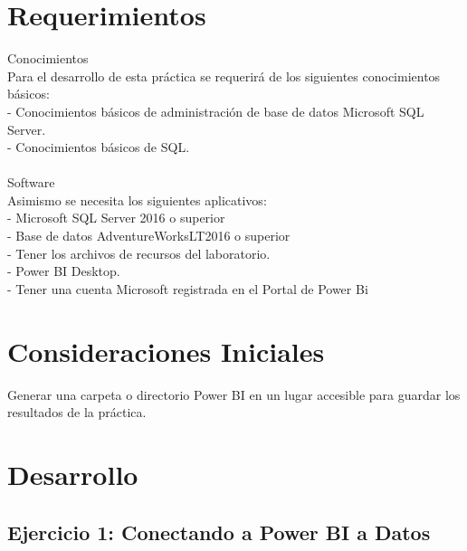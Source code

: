 \documentclass[12pt,letterpaper]{article}
\begin{document}
\section{Requerimientos}
Conocimientos
\\Para el desarrollo de esta práctica se requerirá de los siguientes conocimientos básicos:
\\- Conocimientos básicos de administración de base de datos Microsoft SQL Server.
\\- Conocimientos básicos de SQL.
\\\\Software
\\Asimismo se necesita los siguientes aplicativos:
\\- Microsoft SQL Server 2016 o superior
\\- Base de datos AdventureWorksLT2016 o superior
\\- Tener los archivos de recursos del laboratorio.
\\- Power BI Desktop.
\\- Tener una cuenta Microsoft registrada en el Portal de Power Bi

\section{Consideraciones Iniciales}
Generar una carpeta o directorio Power BI en un lugar accesible para guardar los resultados de la práctica.


\section{Desarrollo}
\subsection{Ejercicio 1: Conectando a Power BI a Datos}
\end{document}
